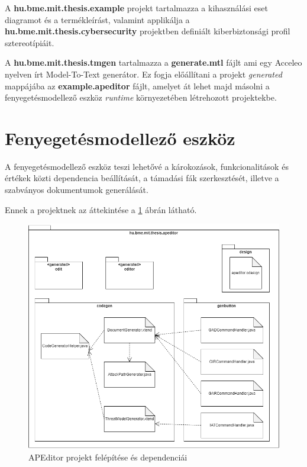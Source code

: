 A \textbf{hu.bme.mit.thesis.example} projekt tartalmazza a kihasználási eset diagramot és a termékleírást, valamint applikálja a \textbf{hu.bme.mit.thesis.cybersecurity} projektben definiált kiberbiztonsági profil sztereotípiáit.

A \textbf{hu.bme.mit.thesis.tmgen} tartalmazza a \textbf{generate.mtl} fájlt ami egy Acceleo nyelven írt Model-To-Text generátor. Ez fogja előállítani a projekt \textit{generated} mappájába az \textbf{example.apeditor} fájlt, amelyet át lehet majd másolni a fenyegetésmodellező eszköz \textit{runtime} környezetében létrehozott projektekbe.

\section{Fenyegetésmodellező eszköz}

A fenyegetésmodellező eszköz teszi lehetővé a károkozások, funkcionalitások és értékek közti dependencia beállítását, a támadási fák szerkesztését, illetve a szabványos dokumentumok generálását.

Ennek a projektnek az áttekintése a \ref{fig:05_apeditor_arch} ábrán látható.

\begin{figure}[!ht]
	\centering
	\includegraphics[width=130mm, keepaspectratio]{figures/05_package_apeditor.png}
	\caption{APEditor projekt felépítése és dependenciái}
	\label{fig:05_apeditor_arch}
\end{figure}

